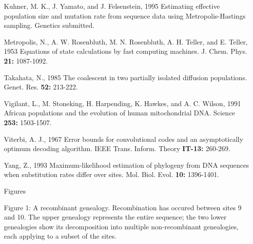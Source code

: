 {\medskip
{\sc Kuhner,} M. K., J. {\sc Yamato,} and J. {\sc Felsenstein,} 1995  
Estimating effective
population size and mutation rate from
sequence data using Metropolis-Hastings sampling.
Genetics submitted.

\medskip
{\sc Metropolis,} N., A. W. {\sc Rosenbluth,} M. N. 
{\sc Rosenbluth,} A. H. {\sc Teller,} and E. {\sc Teller},
1953  Equations of state calculations by fast computing machines.  J.
Chem. Phys. {\bf 21:} 1087-1092.

\medskip
{\sc Takahata,} N., 1985  The coalescent in two partially isolated
diffusion populations.  Genet. Res. {\bf 52:} 213-222.

\medskip
{\sc Vigilant, L., M. Stoneking, H. Harpending, K. Hawkes,} and {\sc A. C.
Wilson,} 1991  African populations and the evolution of human
mitochondrial DNA.  Science {\bf 253:} 1503-1507.
 
\medskip
{\sc Viterbi,} A. J., 1967  Error bounds for convolutional codes and an
asymptotically optimum decoding algorithm.  IEEE Trans. Inform. Theory
{\bf IT-13:} 260-269.

\medskip
{\sc Yang,} Z., 1993  Maximum-likelihood estimation of phylogeny from
DNA sequences when substitution rates differ over sites.  Mol. Biol.
Evol. {\bf 10:} 1396-1401.
}

\bigskip
{\center Figures}
\bigskip

Figure 1:  A recombinant genealogy.  Recombination has occured between
sites 9 and 10.  The upper genealogy represents the entire sequence; the
two lower genealogies show its decomposition into multiple
non-recombinant genealogies, each applying to a subset of the sites.



